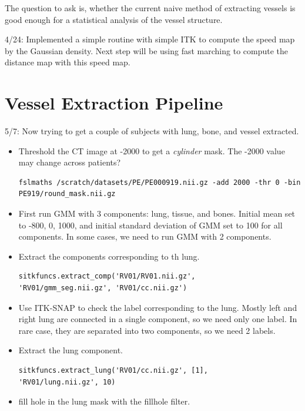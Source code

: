 \documentclass[12pt]{article}
\begin{document}
The question to ask is, whether the current naive method of extracting vessels
is good enough for a statistical analysis of the vessel structure. 

4/24: Implemented a simple routine with simple ITK to compute the speed map by
the Gaussian density. Next step will be using fast marching to compute the
distance map with this speed map. 

\section{Vessel Extraction Pipeline}
5/7: Now trying to get a couple of subjects with lung, bone, and vessel
extracted. 

\begin{itemize}
\item Threshold the CT image at -2000 to get a \emph{cylinder} mask. The -2000
  value may change across patients?

\begin{Verbatim}[frame=single]
fslmaths /scratch/datasets/PE/PE000919.nii.gz -add 2000 -thr 0 -bin
PE919/round_mask.nii.gz
\end{Verbatim}


\item First run GMM with 3 components: lung, tissue, and bones. Initial
mean set to -800, 0, 1000, and initial standard deviation of GMM set to 100
for all components.  In some cases, we need to run GMM with 2 components.
\item Extract the components corresponding to th lung.
\begin{Verbatim}[frame=single]
sitkfuncs.extract_comp('RV01/RV01.nii.gz', 
'RV01/gmm_seg.nii.gz', 'RV01/cc.nii.gz')
\end{Verbatim}
\item Use ITK-SNAP to check the label corresponding to the lung. Mostly left
  and right lung are connected in a single component, so we need only one
  label. In rare case, they are separated into two components, so we need 2
  labels. 

\item Extract the lung component.

\begin{Verbatim}[frame=single]
 sitkfuncs.extract_lung('RV01/cc.nii.gz', [1], 
'RV01/lung.nii.gz', 10)
\end{Verbatim}

\item fill hole in the lung mask with the fillhole filter.


\end{itemize}
\end{document}
